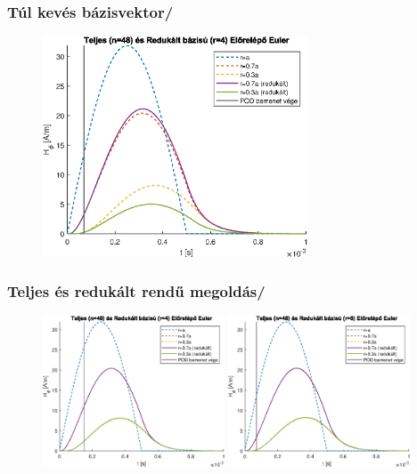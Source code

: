 \documentclass[aspectratio=43]{beamer}
\newcommand{\numframetitle}[1]{\frametitle{#1\hfill\insertframenumber/\insertpresentationendpage\hspace{-\fill}}}
\begin{document}
\begin{frame}
	\numframetitle{Túl kevés bázisvektor}
    	\begin{figure}
			\includegraphics[width=0.7\textwidth]{kep/euler_0.07_4_td.eps}
		\end{figure}
\end{frame}
\begin{frame}
	\numframetitle{Teljes és redukált rendű megoldás}
    	\begin{figure}
			\includegraphics[width=0.48\textwidth]{kep/euler_0.15_4_td.eps}
			\includegraphics[width=0.48\textwidth]{kep/euler_0.07_8_td.eps}
		\end{figure}
\end{frame}
\end{document}
